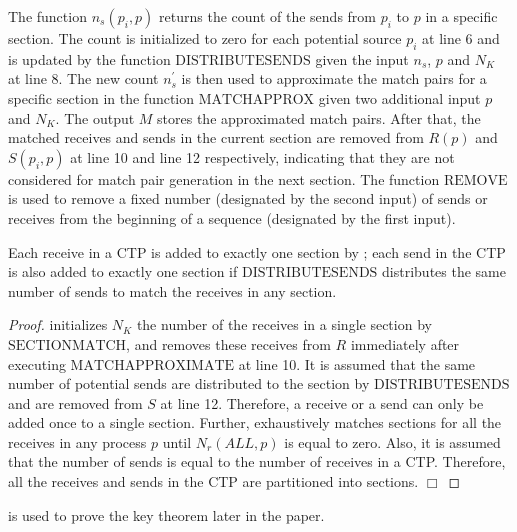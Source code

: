 The function $\mathit{n_s}(p_{i},p)$ returns the count of the  sends from $p_i$ to $p$ in a specific section. The count is initialized to zero for each potential source $p_i$ at line 6 and is updated by the function $\mathrm{DISTRIBUTESENDS}$ given the input $n_s$, $p$ and $N_K$ at line 8. The new count $n_s^\prime$ is then used to approximate the match pairs for a specific section in the function $\mathrm{MATCHAPPROX}$ given two additional input $p$ and $N_K$.
The output $M$ stores the approximated match pairs. After that, the matched receives and sends in the current section are removed from $R(p)$ and $S(p_i,p)$ at line 10 and line 12 respectively, indicating that they are not considered for match pair generation in the next section. The function $\mathrm{REMOVE}$ is used to remove a fixed number (designated by the second input) of sends or receives from the beginning of a sequence (designated by the first input). 
\begin{lemma}
\label{lemma:section}
Each receive in a CTP is added to exactly one section by ; each send in the CTP is also added to exactly one section if $\mathrm{DISTRIBUTESENDS}$ distributes the same number of sends to match the receives in any section.
\end{lemma}
\begin{proof}
 initializes $N_K$ the number of the receives in a single section by $\mathrm{SECTIONMATCH}$, and removes these receives from $R$ immediately after executing $\mathrm{MATCHAPPROXIMATE}$ at line 10. It is assumed that the same number of potential sends are distributed to the section by $\mathrm{DISTRIBUTESENDS}$ and are removed from $S$ at line 12. Therefore, a receive or a send can only be added once to a single section. 
Further,  exhaustively matches sections for all the receives in any process $p$ until $N_r(ALL,p)$ is equal to zero. Also, it is assumed that the number of sends is equal to the number of receives in a CTP. 
Therefore, all the receives and sends in the CTP are partitioned into sections. 
$\Box$
\end{proof}
 is used to prove the key theorem later in the paper.


